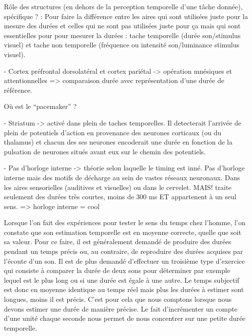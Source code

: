 \documentclass[12pt,fleqn,oneside,openany]{book} %
\begin{document}
	Rôle des structures (en dehors de la perception temporelle d'une tâche donnée), spécifique ? : 
		Pour faire la différence entre les aires qui sont utilisées juste pour la mesure des durées et celles qui ne sont pas utilisées juste pour ça mais qui sont essentielles pour pour mesurer la durées : tache temporelle (durée son/stimulus visuel) et tache non temporelle (fréquence ou intensité son/luminance stimulus visuel). 

		- Cortex préfrontal dorsolatéral et cortex pariétal -> opération mnésiques et attentionnelles => comparaison durée avec représentation d'une durée de référence.
	
	Où est le ``pacemaker'' ? 

		- Striatum -> activé dans plein de taches temporelles. Il detecterait l'arrivée de plein de potentiels d'action en provenance des neurones corticaux (ou du thalamus) et chacun des ses neurones encoderait une durée en fonction de la pulsation de neurones situés avant eux sur le chemin des potentiels. 
		
		- Pas d'horloge interne -> théorie selon laquelle le timing est inné. Pas d'horloge interne mais des motifs de décharge au sein de vastes réseaux neuronaux. Dans les aires sensorielles (auditives et visuelles) ou dans le cervelet. MAIS! traite seulement des durées très courtes, moins de 300 ms ET appartenent à un seul sens. => horloge interne = cool

Lorsque l'on fait des expériences pour tester le sens du temps chez l'homme, l'on constate que son estimation temporelle est en moyenne correcte, quelle que soit sa valeur. Pour ce faire, il est généralement demandé de produire des durées pendant un temps précis ou, au contraire, de reproduire des durées acquises par l'écoute d'un son. Il est de plus demandé d'effectuer un troisième type d'exercice qui consiste à comparer la durée de deux sons pour déterminer par exemple lequel est le plus long ou si une durée est égale à une autre.
Le temps subjectif est donc en moyenne identique au temps réel mais plus les durées à estimer sont longues, moins il est précis. C'est pour cela que nous comptons lorsque nous devons estimer une durée de manière précise. Le fait d'incrémenter un compte d'une unité chaque seconde nous permet de nous concentrer sur une petite durée temporelle.

\begin{figure}[h]
\end{figure}
\end{document}
